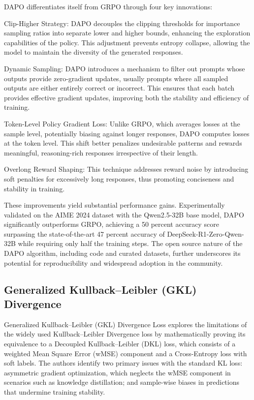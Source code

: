 \documentclass[11pt, oneside]{article}   	%
\begin{document}
DAPO differentiates itself from GRPO through four key innovations:

Clip-Higher Strategy: DAPO decouples the clipping thresholds for importance sampling ratios into separate lower and higher bounds, enhancing the exploration capabilities of the policy. This adjustment prevents entropy collapse, allowing the model to maintain the diversity of the generated responses.

Dynamic Sampling: DAPO introduces a mechanism to filter out prompts whose outputs provide zero-gradient updates, usually prompts where all sampled outputs are either entirely correct or incorrect. This ensures that each batch provides effective gradient updates, improving both the stability and efficiency of training.

Token-Level Policy Gradient Loss: Unlike GRPO, which averages losses at the sample level, potentially biasing against longer responses, DAPO computes losses at the token level. This shift better penalizes undesirable patterns and rewards meaningful, reasoning-rich responses irrespective of their length.

Overlong Reward Shaping: This technique addresses reward noise by introducing soft penalties for excessively long responses, thus promoting conciseness and stability in training.

These improvements yield substantial performance gains. Experimentally validated on the AIME 2024 dataset with the Qwen2.5-32B base model, DAPO significantly outperforms GRPO, achieving a 50 percent accuracy score surpassing the state-of-the-art 47 percent accuracy of DeepSeek-R1-Zero-Qwen-32B while requiring only half the training steps. The open source nature of the DAPO algorithm, including code and curated datasets, further underscores its potential for reproducibility and widespread adoption in the community.

\subsection*{Generalized Kullback–Leibler (GKL) Divergence  \cite{cui2025generalizedkullbackleiblerdivergenceloss}}

Generalized Kullback–Leibler (GKL) Divergence Loss explores the limitations of the widely used Kullback–Leibler Divergence loss by mathematically proving its equivalence to a Decoupled Kullback–Leibler (DKL) loss, which consists of a weighted Mean Square Error (wMSE) component and a Cross-Entropy loss with soft labels. The authors identify two primary issues with the standard KL loss: asymmetric gradient optimization, which neglects the wMSE component in scenarios such as knowledge distillation; and sample-wise biases in predictions that undermine training stability.
\end{document}
